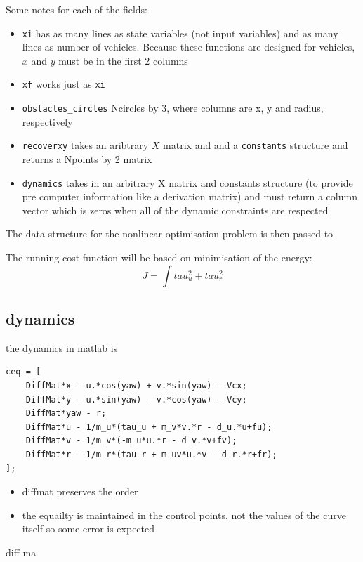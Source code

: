 \par Some notes for each of the fields:

\begin{itemize}
    \item \texttt{xi} has as many lines as state variables (not input variables) and as many lines as number of vehicles. Because these functions are designed for vehicles, $x$ and $y$ must be in the first 2 columns
    \item \texttt{xf} works just as \texttt{xi}
    \item \texttt{obstacles\_circles}  Ncircles by 3, where columns are x, y and radius, respectively
    \item \texttt{recoverxy} takes an aribtrary $X$ matrix and and a \texttt{constants} structure and returns a Npoints by 2 matrix
    \item \texttt{dynamics} takes in an arbitrary X matrix and constants structure (to provide pre computer information like a derivation matrix) and must return a column vector which is zeros when all of the dynamic constraints are respected
\end{itemize}

\par The data structure for the nonlinear optimisation problem is then passed to 

The running cost function will be based on minimisation of the energy:
\begin{equation}
    J = \int tau_u^2 + tau_r^2
\end{equation}

\subsection{dynamics}

the dynamics in matlab is 

\begin{lstlisting}[language=matlabfloz,caption={\mcode{Matlab Function}}]
ceq = [
    DiffMat*x - u.*cos(yaw) + v.*sin(yaw) - Vcx;
    DiffMat*y - u.*sin(yaw) - v.*cos(yaw) - Vcy;
    DiffMat*yaw - r;
    DiffMat*u - 1/m_u*(tau_u + m_v*v.*r - d_u.*u+fu);
    DiffMat*v - 1/m_v*(-m_u*u.*r - d_v.*v+fv);
    DiffMat*r - 1/m_r*(tau_r + m_uv*u.*v - d_r.*r+fr);
];
\end{lstlisting}

\begin{itemize}
    \item diffmat preserves the order
    \item the equailty is maintained in the control points, not the values of the curve itself so some error is expected
\end{itemize}
diff ma
